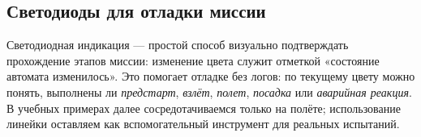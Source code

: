 \subsection{Светодиоды для отладки миссии}
Светодиодная индикация — простой способ визуально подтверждать прохождение этапов миссии: изменение цвета служит отметкой «состояние автомата изменилось». Это помогает отладке без логов: по текущему цвету можно понять, выполнены ли \emph{предстарт}, \emph{взлёт}, \emph{полет}, \emph{посадка} или \emph{аварийная реакция}. В учебных примерах далее сосредотачиваемся только на полёте; использование линейки оставляем как вспомогательный инструмент для реальных испытаний.
